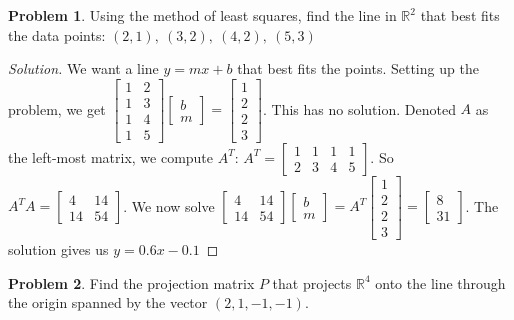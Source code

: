 \documentclass[oneside]{book}
\theoremstyle{definition}
\newtheorem{problem}{Problem}[section]
\begin{document}
\begin{problem}
Using the method of least squares, find the line in $\mathbb{R}^2$ that best fits the data points: $(2,1),\ (3,2),\ (4,2),\ (5,3)$
\end{problem}
\begin{proof}[Solution]
We want a line $y=mx+b$ that best fits the points. Setting up the problem, we get $\begin{bmatrix} 1 & 2 \\ 1 & 3 \\ 1 & 4 \\ 1 & 5 \end{bmatrix} \begin{bmatrix} b \\ m \end{bmatrix} = \begin{bmatrix} 1 \\ 2 \\ 2 \\ 3\end{bmatrix}$. This has no solution. Denoted $A$ as the left-most matrix, we compute $A^T$: $A^T = \begin{bmatrix} 1 & 1 & 1 & 1 \\ 2 & 3 & 4 & 5 \end{bmatrix}$. So $A^T A = \begin{bmatrix} 4 & 14 \\ 14 & 54 \end{bmatrix}$. We now solve $\begin{bmatrix} 4 & 14 \\ 14 & 54 \end{bmatrix} \begin{bmatrix} b \\ m \end{bmatrix} =  A^T \begin{bmatrix} 1 \\ 2 \\ 2 \\ 3 \end{bmatrix} = \begin{bmatrix} 8 \\ 31 \end{bmatrix}$. The solution gives us $y = 0.6x-0.1$
\end{proof}

\begin{problem}
Find the projection matrix $P$ that projects $\mathbb{R}^4$ onto the line through the origin spanned by the vector $(2,1,-1,-1)$.
\end{problem}
\end{document}
